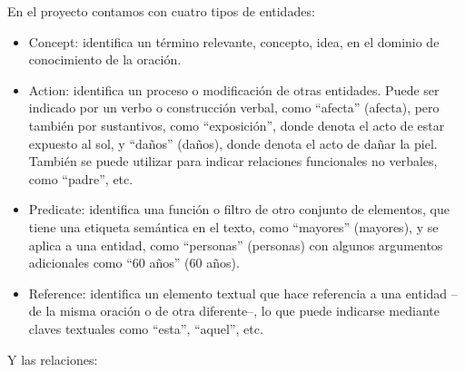 \documentclass[10pt]{article} %
\begin{document}
	En el proyecto contamos con cuatro tipos de entidades:
	\begin{itemize}
		\item Concept: identifica un término relevante, concepto, idea, en el dominio de conocimiento de la oración.
		\item Action: identifica un proceso o modificación de otras entidades. Puede ser indicado por un verbo o construcción verbal, como “afecta” (afecta), pero también por sustantivos, como “exposición”, donde denota el acto de estar expuesto al sol, y “daños” (daños), donde denota el acto de dañar la piel. También se puede utilizar para indicar relaciones funcionales no verbales, como “padre”, etc.
		\item Predicate: identifica una función o filtro de otro conjunto de elementos, que tiene una etiqueta semántica en el texto, como “mayores” (mayores), y se aplica a una entidad, como “personas” (personas) con algunos argumentos adicionales como “60 años” (60 años).
		\item Reference: identifica un elemento textual que hace referencia a una entidad –de la misma oración o de otra diferente–, lo que puede indicarse mediante claves textuales como “esta”, “aquel”, etc.
	\end{itemize}
	
	Y las relaciones:
	
\end{document}
